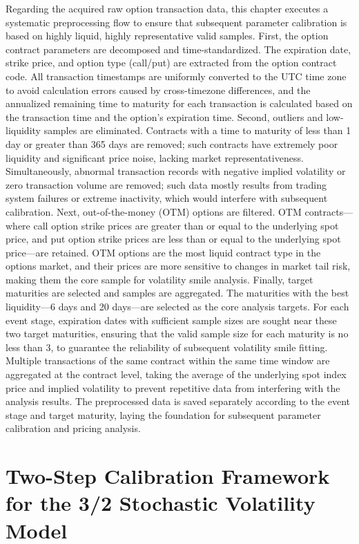 Regarding the acquired raw option transaction data, this chapter executes a systematic preprocessing flow to ensure that subsequent parameter calibration is based on highly liquid, highly representative valid samples. First, the option contract parameters are decomposed and time-standardized. The expiration date, strike price, and option type (call/put) are extracted from the option contract code. All transaction timestamps are uniformly converted to the UTC time zone to avoid calculation errors caused by cross-timezone differences, and the annualized remaining time to maturity for each transaction is calculated based on the transaction time and the option's expiration time. Second, outliers and low-liquidity samples are eliminated. Contracts with a time to maturity of less than 1 day or greater than 365 days are removed; such contracts have extremely poor liquidity and significant price noise, lacking market representativeness. Simultaneously, abnormal transaction records with negative implied volatility or zero transaction volume are removed; such data mostly results from trading system failures or extreme inactivity, which would interfere with subsequent calibration. Next, out-of-the-money (OTM) options are filtered. OTM contracts—where call option strike prices are greater than or equal to the underlying spot price, and put option strike prices are less than or equal to the underlying spot price—are retained. OTM options are the most liquid contract type in the options market, and their prices are more sensitive to changes in market tail risk, making them the core sample for volatility smile analysis. Finally, target maturities are selected and samples are aggregated. The maturities with the best liquidity—6 days and 20 days—are selected as the core analysis targets. For each event stage, expiration dates with sufficient sample sizes are sought near these two target maturities, ensuring that the valid sample size for each maturity is no less than 3, to guarantee the reliability of subsequent volatility smile fitting. Multiple transactions of the same contract within the same time window are aggregated at the contract level, taking the average of the underlying spot index price and implied volatility to prevent repetitive data from interfering with the analysis results. The preprocessed data is saved separately according to the event stage and target maturity, laying the foundation for subsequent parameter calibration and pricing analysis.

\section{Two-Step Calibration Framework for the 3/2 Stochastic Volatility Model}

